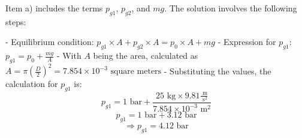 Item a) includes the terms \( p_{g1} \), \( p_{g2} \), and \( mg \). The solution involves the following steps:

- Equilibrium condition: \( p_{g1} \times A + p_{g2} \times A = p_0 \times A + mg \)
- Expression for \( p_{g1} \): \( p_{g1} = p_0 + \frac{mg}{A} \)
- With \( A \) being the area, calculated as \( A = \pi \left( \frac{D}{2} \right)^2 = 7.854 \times 10^{-3} \text{ square meters} \)
- Substituting the values, the calculation for \( p_{g1} \) is:
  \[
  p_{g1} = 1 \text{ bar} + \frac{25 \text{ kg} \times 9.81 \frac{\text{ m}}{\text{ s}^2}}{7.854 \times 10^{-3} \text{ m}^2}
  \]
  \[
  p_{g1} = 1 \text{ bar} + 3.12 \text{ bar}
  \]
  \[
  \Rightarrow p_{g1} = 4.12 \text{ bar}
  \]